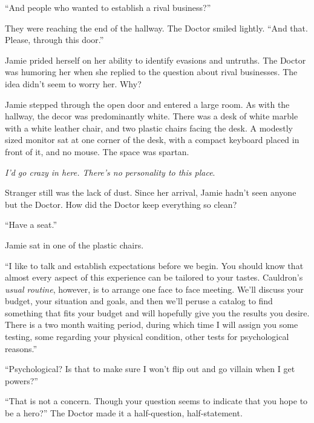 ``And people who wanted to establish a rival business?''



They were reaching the end of the hallway.  The Doctor smiled lightly.  ``And that.  Please, through this door.''



Jamie prided herself on her ability to identify evasions and untruths.  The Doctor was humoring her when she replied to the question about rival businesses.  The idea didn't seem to worry her.  Why?



Jamie stepped through the open door and entered a large room.  As with the hallway, the decor was predominantly white.  There was a desk of white marble with a white leather chair, and two plastic chairs facing the desk.  A modestly sized monitor sat at one corner of the desk, with a compact keyboard placed in front of it, and no mouse.  The space was spartan.



\emph{I'd go crazy in here.  There's no personality to this place}.



Stranger still was the lack of dust.  Since her arrival, Jamie hadn't seen anyone but the Doctor.  How did the Doctor keep everything so clean?



``Have a seat.''



Jamie sat in one of the plastic chairs.



``I like to talk and establish expectations before we begin.  You should know that almost every aspect of this experience can be tailored to your tastes.  Cauldron's \emph{usual routine}, however, is to arrange one face to face meeting.  We'll discuss your budget, your situation and goals, and then we'll peruse a catalog to find something that fits your budget and will hopefully give you the results you desire.  There is a two month waiting period, during which time I will assign you some testing, some regarding your physical condition, other tests for psychological reasons.''



``Psychological?  Is that to make sure I won't flip out and go villain when I get powers?''



``That is not a concern.  Though your question seems to indicate that you hope to be a hero?''  The Doctor made it a half-question, half-statement.



